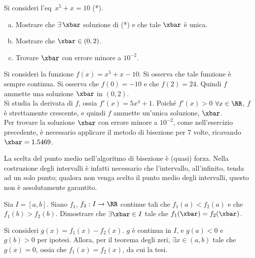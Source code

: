 \documentclass[11pt]{article}
\begin{document}
	\begin{exercise}
		Si consideri l'eq~$x^5+x=10$ (*).
		
		\begin{enumerate}[(a)]
			\item Mostrare che $\exists\, \xbar$ soluzione di (*) e che
			tale $\xbar$ è unica.
			\item Mostrare che $\xbar \in (0, 2)$.
			\item Trovare $\xbar$ con errore minore a $10^{-2}$.
		\end{enumerate}
	\end{exercise}

	\begin{solution}
		Si consideri la funzione $f(x) = x^5 + x - 10$. Si osserva che
		tale funzione è sempre continua. Si osserva che $f(0) = -10$ e che
		$f(2) = 24$. Quindi $f$ ammette una soluzione $\xbar$ in
		$(0, 2)$. \\
		
		Si studia la derivata di $f$, ossia $f'(x) = 5x^4+1$. Poiché
		$f'(x) > 0$ $\forall x \in \RR$, $f$ è strettamente crescente,
		e quindi $f$ ammette un'unica soluzione, $\xbar$. \\
		
		Per trovare la soluzione $\xbar$ con errore minore a $10^{-2}$,
		come nell'esercizio precedente, è necessario applicare
		il metodo di bisezione per $7$ volte, ricavando
		$\xbar = 1.5469$.
	\end{solution}

	\begin{remark}
		La scelta del punto medio nell'algoritmo di bisezione è (quasi)
		forza. Nella costruzione degli intervalli è infatti
		necessario che l'intervallo, all'infinito, tenda ad un solo
		punto; qualora non venga scelto il punto medio degli intervalli,
		questo non è assolutamente garantito.
	\end{remark}

	\begin{exercise}
		Sia $I = [a, b]$. Siano $f_1$, $f_2 : I \to \RR$ continue tali che
		$f_1(a) < f_2(a)$ e che $f_1(b) > f_2(b)$. Dimostrare che $\exists \xbar \in I$ tale che $f_1(\xbar) = f_2(\xbar)$.
	\end{exercise}

	\begin{solution}
		Si consideri $g(x) = f_1(x) - f_2(x)$. $g$ è continua in $I$, e
		$g(a) < 0$ e $g(b) > 0$ per ipotesi. Allora, per il teorema degli
		zeri, $\exists x \in (a, b)$ tale che $g(x) = 0$, ossia
		che $f_1(x) = f_2(x)$, da cui la tesi.
	\end{solution}
	
\end{document}
